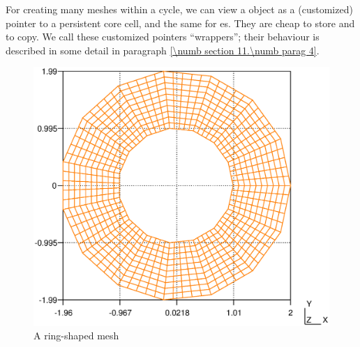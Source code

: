 For creating many meshes within a cycle, we can view a {\small\tt {}} object as a
(customized) pointer to a persistent core cell, and the same for {\small\tt {}}es.
They are cheap to store and to copy.
We call these customized pointers ``wrappers''; their behaviour is described in some detail in
paragraph \ref{\numb section 11.\numb parag 4}.

\begin{figure}[ht] \centering
  \includegraphics[width=115mm]{ring.eps}
  \caption{A ring-shaped mesh}
  \label{\numb section 9.\numb fig 1}
\end{figure}

